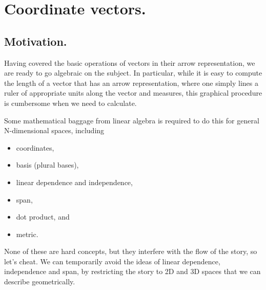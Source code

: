 
\section{Coordinate vectors.}
\subsection{Motivation.}
Having covered the basic operations of vectors in their arrow representation, we are ready to go algebraic on the subject.
In particular, while
it is easy to compute the length of a vector that has an arrow representation, where
one simply lines a ruler of appropriate units along the vector and measures, this graphical procedure is cumbersome when we need to calculate.

Some mathematical baggage from linear algebra is required to do this for general N-dimensional spaces, including
\begin{itemize}
\item coordinates,
\item basis (plural bases),
\item linear dependence and independence,
\item span,
\item dot product, and
\item metric.
\end{itemize}
None of these are hard concepts, but they interfere with the flow of the story, so let's cheat.
We can temporarily avoid the ideas of linear dependence, independence and span, by restricting the story to 2D and 3D spaces that we can describe geometrically.
